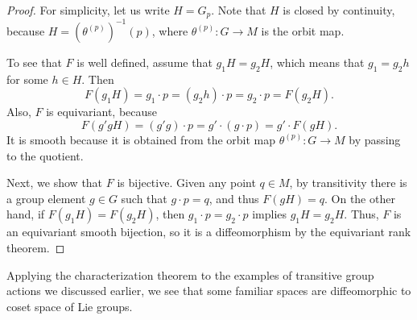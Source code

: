 \begin{proof}
For simplicity, let us write $H=G_p$. Note that $H$ is closed by continuity, because $H=(\theta^{(p)})^{-1}(p)$, where $\theta^{(p)}:G\to M$ is the orbit map.\par
To see that $F$ is well defined, assume that $g_1H=g_2H$, which means that $g_1=g_2h$ for some $h\in H$. Then
\[F(g_1H)=g_1\cdot p=(g_2h)\cdot p=g_2\cdot p=F(g_2H).\]
Also, $F$ is equivariant, because
\[F(g'gH)=(g'g)\cdot p=g'\cdot (g\cdot p)=g'\cdot F(gH).\]
It is smooth because it is obtained from the orbit map $\theta^{(p)}:G\to M$ by passing to the quotient.\par
Next, we show that $F$ is bijective. Given any point $q\in M$, by transitivity there is a group element $g\in G$ such that $g\cdot p=q$, and thus $F(gH)=q$. On the other hand, if $F(g_1H)=F(g_2H)$, then $g_1\cdot p=g_2\cdot p$ implies $g_1H=g_2H$. Thus, $F$ is an equivariant smooth bijection, so it is a diffeomorphism by the equivariant rank theorem.
\end{proof}
Applying the characterization theorem to the examples of transitive group actions we discussed earlier, we see that some familiar spaces are diffeomorphic to coset space of Lie groups.
